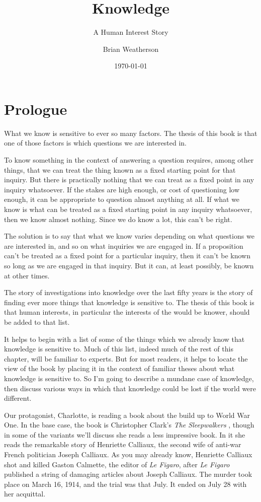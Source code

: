 \documentclass[11pt,]{book}
\title{Knowledge}
\subtitle{A Human Interest Story}
\author{Brian Weatherson}
\date{\today}
\begin{document}
\maketitle

{
\setcounter{tocdepth}{1}
\tableofcontents
}
\hypertarget{prologue}{%
\chapter{Prologue}\label{prologue}}

What we know is sensitive to ever so many factors. The thesis of this book is that one of those factors is which questions we are interested in.

To know something in the context of answering a question requires, among other things, that we can treat the thing known as a fixed starting point for that inquiry. But there is practically nothing that we can treat as a fixed point in any inquiry whatsoever. If the stakes are high enough, or cost of questioning low enough, it can be appropriate to question almost anything at all. If what we know is what can be treated as a fixed starting point in any inquiry whatsoever, then we know almost nothing. Since we do know a lot, this can't be right.

The solution is to say that what we know varies depending on what questions we are interested in, and so on what inquiries we are engaged in. If a proposition can't be treated as a fixed point for a particular inquiry, then it can't be known so long as we are engaged in that inquiry. But it can, at least possibly, be known at other times.

The story of investigations into knowledge over the last fifty years is the story of finding ever more things that knowledge is sensitive to. The thesis of this book is that human interests, in particular the interests of the would be knower, should be added to that list.

It helps to begin with a list of some of the things which we already know that knowledge is sensitive to. Much of this list, indeed much of the rest of this chapter, will be familiar to experts. But for most readers, it helps to locate the view of the book by placing it in the context of familiar theses about what knowledge is sensitive to. So I'm going to describe a mundane case of knowledge, then discuss various ways in which that knowledge could be lost if the world were different.

Our protagonist, Charlotte, is reading a book about the build up to World War One. In the base case, the book is Christopher Clark's \emph{The Sleepwalkers} \citep{Clark2012}, though in some of the variants we'll discuss she reads a less impressive book. In it she reads the remarkable story of Henriette Calliaux, the second wife of anti-war French politician Joseph Calliaux. As you may already know, Henriette Calliaux shot and killed Gaston Calmette, the editor of \emph{Le Figaro}, after \emph{Le Figaro} published a string of damaging articles about Joseph Calliaux. The murder took place on March 16, 1914, and the trial was that July. It ended on July 28 with her acquittal.
\end{document}
